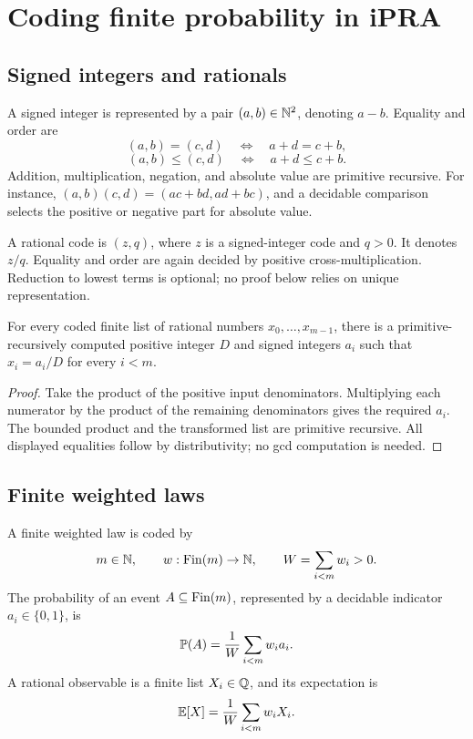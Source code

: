 \section{Coding finite probability in iPRA}\label{sec:coding}

\subsection{Signed integers and rationals}

A signed integer is represented by a pair \((a,b)\in\mathbb N^2\), denoting
\(a-b\).  Equality and order are
\[
 (a,b)=(c,d) \quad\Longleftrightarrow\quad a+d=c+b,
\]
\[
 (a,b)\le(c,d) \quad\Longleftrightarrow\quad a+d\le c+b.
\]
Addition, multiplication, negation, and absolute value are primitive recursive.
For instance,
\((a,b)(c,d)=(ac+bd,ad+bc)\), and a decidable comparison selects the positive
or negative part for absolute value.

A rational code is \((z,q)\), where \(z\) is a signed-integer code and
\(q>0\).  It denotes \(z/q\).  Equality and order are again decided by positive
cross-multiplication.  Reduction to lowest terms is optional; no proof below
relies on unique representation.

\begin{lemma}\label{lem:common-den}
For every coded finite list of rational numbers
\(x_0,\ldots,x_{m-1}\), there is a primitive-recursively computed positive
integer \(D\) and signed integers \(a_i\) such that \(x_i=a_i/D\) for every
\(i<m\).
\end{lemma}

\begin{proof}
Take the product of the positive input denominators.  Multiplying each
numerator by the product of the remaining denominators gives the required
\(a_i\).  The bounded product and the transformed list are primitive recursive.
All displayed equalities follow by distributivity; no gcd computation is
needed.
\end{proof}

\subsection{Finite weighted laws}

\begin{definition}\label{def:finlaw}
A finite weighted law is coded by
\[
 m\in\mathbb N,\qquad w:\operatorname{Fin}(m)\to\mathbb N,
 \qquad W=\sum_{i<m}w_i>0.
\]
The probability of an event \(A\subseteq\operatorname{Fin}(m)\), represented by a decidable
indicator \(a_i\in\{0,1\}\), is
\[
 \mathbb P(A)=\frac{1}{W}\sum_{i<m}w_i a_i.
\]
A rational observable is a finite list \(X_i\in\mathbb Q\), and its expectation is
\[
 \mathbb E[X]=\frac{1}{W}\sum_{i<m}w_iX_i.
\]
\end{definition}

